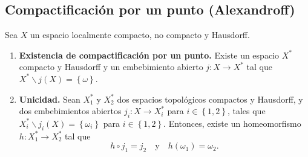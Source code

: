 \subsection{Compactificación por un punto (Alexandroff)}
\begin{prop}
Sea $\displaystyle X $ un espacio localmente compacto, no compacto y Hausdorff. 
\begin{enumerate}
	\item \textbf{Existencia de compactificación por un punto.} Existe un espacio $\displaystyle X^{*} $ compacto y Hausdorff y un embebimiento abierto $\displaystyle j : X \to X^{*} $ tal que $\displaystyle X^{*}\backslash j\left(X\right)= \left\{ \omega \right\}  $.
	\item \textbf{Unicidad.} Sean $\displaystyle X_{1}^{*} $ y $\displaystyle X_{2}^{*} $ dos espacios topológicos compactos y Hausdorff, y dos embebimientos abiertos $\displaystyle j_{i}: X \to X_{i}^{*} $ para $\displaystyle i \in \left\{ 1,2\right\}  $, tales que $\displaystyle X_{i}^{*}\backslash j_{i}\left(X\right) = \left\{ \omega _{i}\right\} $ para $\displaystyle i \in \left\{ 1,2\right\}  $. Entonces, existe un homeomorfismo $\displaystyle h : X_{1}^{*}\to X_{2}^{*} $ tal que 
		\[h\circ j_{1} = j_{2} \quad \text{y} \quad h\left(\omega_{1}\right)=\omega_{2} .\]
\end{enumerate}
\end{prop}

